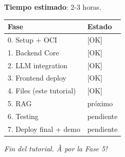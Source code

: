 \documentclass[11pt,a4paper,oneside]{article}
\begin{document}
\textbf{Tiempo estimado}: 2-3 horas.

\begin{center}
\begin{tabular}{ll}
\toprule
Fase & Estado \\
\midrule
0. Setup + OCI & [OK] \\
1. Backend Core & [OK] \\
2. LLM integration & [OK] \\
3. Frontend deploy & [OK] \\
4. Files (este tutorial) & [OK] \\
5. RAG & pr\'oximo \\
6. Testing & pendiente \\
7. Deploy final + demo & pendiente \\
\bottomrule
\end{tabular}
\end{center}

\vspace{2em}
\begin{center}
\textit{Fin del tutorial. \`A por la Fase 5!}
\end{center}
\end{document}
